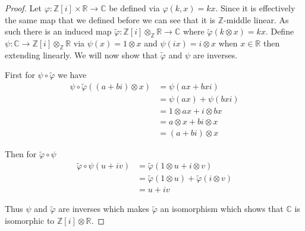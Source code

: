 \documentclass[10pt]{article}
\newcommand{\sk}{\vskip 10mm}
\newcommand{\bb}[1]{\mathbb{#1}}
\newcommand{\wt}[1]{\widetilde{#1}}
\theoremstyle{plain}
\theoremstyle{remark}
\begin{document}
\begin{proof}
  Let $\varphi:\bb{Z}[i]\times\bb{R}\rightarrow \bb{C}$ be defined via $\varphi(k,x)=kx$. Since it
  is effectively the same map that we defined before we can see that it
  is $\bb{Z}$-middle linear. As such there is an induced map
  $\wt{\varphi}:\bb{Z}[i]\otimes_{\bb{Z}}\bb{R}\rightarrow\bb{C}$ where $\wt{\varphi}(k\otimes x)=kx$.
  Define $\psi:\bb{C}\rightarrow \bb{Z}[i]\otimes_{\bb{Z}}\bb{R}$ via $\psi(x)=1\otimes x$ and $\psi(ix)=i\otimes x$
  when $x\in \bb{R}$ then extending linearly. We will now show that $\wt{\varphi}$ and
  $\psi$ are inverses.

  First for $\psi\circ\wt{\varphi}$ we have
  \begin{align*}
    \psi\circ\wt{\varphi}((a+bi)\otimes x) &= \psi(ax+bxi)\\
                        &= \psi(ax)+\psi(bxi)\\
                        &= 1\otimes ax + i\otimes bx\\
                        &= a\otimes x + bi\otimes x\\
                        &= (a+bi)\otimes x
  \end{align*}

  Then for $\wt{\varphi}\circ\psi$
  \begin{align*}
    \wt{\varphi}\circ\psi(u+iv) &= \wt{\varphi}(1\otimes u+i\otimes v)\\
                   &= \wt{\varphi}(1\otimes u)+\wt{\varphi}(i\otimes v)\\
                   &= u+iv
  \end{align*}

  Thus $\psi$ and $\wt{\varphi}$ are inverses which makes $\wt{\varphi}$ an isomorphism
  which shows that $\bb{C}$ is isomorphic to $\bb{Z}[i]\otimes \bb{R}$.
\end{proof}

\sk
\end{document}
